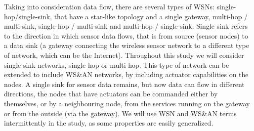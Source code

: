 Taking into consideration data flow, there are several types of WSNs: single-hop/single-sink, that have a star-like topology and
a single gateway, multi-hop / multi-sink, single-hop / multi-sink and multi-hop / single-sink. Single sink refers to the direction
in which sensor data flows, that is from source (sensor nodes) to a data sink (a gateway connecting the wireless sensor network
to a different type of network, which can be the Internet). Throughout this study we will consider single-sink networks, single-hop
or multi-hop. This type of network can be extended to include WS\&AN networks, by including actuator capabilities on the nodes. A single
sink for sensor data remains, but now data can flow in different directions, the nodes that have actuators can be commanded either by 
themselves, or by a neighbouring node, from the services running on the gateway or from the outside (via the gateway). We will
use WSN and WS\&AN terms intermittently in the study, as some properties are easily generalized.


